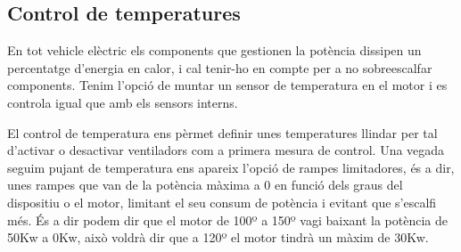 \subsection{Control de temperatures}

En tot vehicle elèctric els components que gestionen la potència dissipen un percentatge d'energia en calor, i cal tenir-ho en compte per a no sobreescalfar components. Tenim l'opció de muntar un sensor de temperatura en el motor i es controla igual que amb els sensors interns.

El control de temperatura ens pèrmet definir unes temperatures llindar per tal d'activar o desactivar ventiladors com a primera mesura de control. Una vegada seguim pujant de temperatura ens apareix l'opció de rampes limitadores, és a dir, unes rampes que van de la potència màxima a 0 en funció dels graus del dispositiu o el motor, limitant el seu consum de potència i evitant que s'escalfi més. És a dir podem dir que el motor de 100º a 150º vagi baixant la potència de 50Kw a 0Kw, això voldrà dir que a 120º el motor tindrà un màxim de 30Kw.

